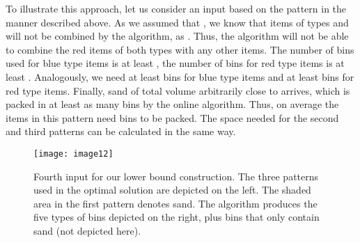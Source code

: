 To illustrate this approach, let us consider an input based on the pattern  in the manner described above. As we assumed that , we know that items of types  and  will not be 
combined by the algorithm, as . Thus, the algorithm will not be able to combine the red items 
of both types with any other items. 
The number of bins used for blue type  items is at least , 
the number of bins for red type  items is at least . 
Analogously, we need at least  bins for blue type  items and at least 
 bins for red type  items. Finally, sand of total volume arbitrarily close to  
arrives, which is packed in at least as many bins by the online algorithm. 
Thus, on average the items in this pattern need  bins to be packed.
The space needed for the second and third patterns can be calculated in the same way. 


\begin{figure}[h]
	\texttt{[image: image12]}
	\caption{Fourth input for our lower bound construction. The three patterns used in the optimal solution are depicted on the left. The shaded area in the first pattern denotes sand. The algorithm produces the five types of bins depicted on the right, plus bins that only contain sand (not depicted here).}
	\label{fig:lower-bound}
\end{figure}

